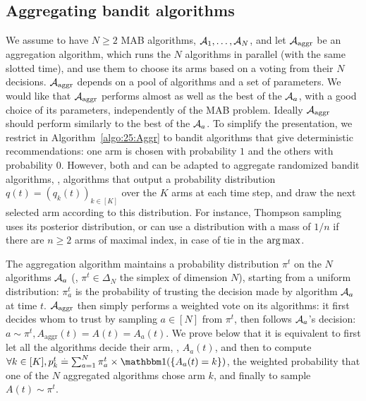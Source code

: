 \subsection{Aggregating bandit algorithms}\label{sub:25:aggregation}
%
We assume to have $N \geq 2$ MAB algorithms, $\mathcal{A}_1, \dots, \mathcal{A}_N$,
and let $\mathcal{A}_{\mathrm{aggr}}$ be an aggregation algorithm,
which runs the $N$ algorithms in parallel (with the same slotted time), and use them to choose its arms based on a voting from their $N$ decisions.
%
$\mathcal{A}_{\mathrm{aggr}}$ depends on a pool of algorithms and a set of parameters.
We would like that $\mathcal{A}_{\mathrm{aggr}}$
performs almost as well as the best of the $\mathcal{A}_a$, with a good choice of its parameters, independently of the MAB problem.
Ideally $\mathcal{A}_{\mathrm{aggr}}$ should perform similarly to the best of the $\mathcal{A}_a$.
%
To simplify the presentation, we restrict in Algorithm~\ref{algo:25:Aggr} to bandit algorithms that give deterministic recommendations: one arm is chosen with probability $1$ and the others with probability $0$.
%
However, both \ExpQ{} and \Aggr{} can be adapted to aggregate randomized bandit algorithms, \ie, algorithms that output a probability distribution $q(t) = (q_k(t))_{k\in[K]}$ over the $K$ arms at each time step, and draw the next selected arm according to this distribution.
For instance, Thompson sampling uses its posterior distribution, or \UCB{} can use a distribution with a mass of $1/n$ if there are $n\geq2$ arms of maximal index, in case of tie in the $\operatorname*{arg\,max}$.

The aggregation algorithm maintains a probability distribution $\pi^{t}$ on the $N$ algorithms $\mathcal{A}_a$ (\ie, $\pi^{t}\in\Delta_N$ the simplex of dimension $N$), starting from a uniform distribution:
$\pi^t_a$ is the probability of trusting the decision made by algorithm $\mathcal{A}_a$ at time $t$.
$\mathcal{A}_{\mathrm{aggr}}$ then simply performs a weighted vote on its algorithms: it first decides whom to trust by sampling $a \in [N]$ from $\pi^t$, then follows $\mathcal{A}_a$'s decision: $a \sim \pi^t, A_{\mathrm{aggr}}(t) = A(t) = A_a(t)$.
We prove below that it is equivalent to first let all the algorithms decide their arm, \ie, $A_a(t)$, and then to compute
$\forall k\in[K], p^{t}_k \eqdef \sum_{a = 1}^{N} \pi^{t}_a \times \indic(\{A_a(t) = k\})$, the weighted probability that one of the $N$ aggregated algorithms chose arm $k$, and finally to sample $A(t)\sim\pi^t$.

